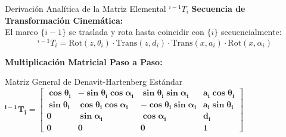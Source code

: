 \documentclass[aspectratio=169]{beamer}
\begin{document}
\begin{frame}{Derivación Analítica de la Matriz Elemental $^{i-1}T_i$}
    \textbf{Secuencia de Transformación Cinemática:}\\
    El marco $\{i-1\}$ se traslada y rota hasta coincidir con $\{i\}$ secuencialmente:
    \begin{equation*}
        ^{i-1}T_i = \text{Rot}(z, \theta_i) \cdot \text{Trans}(z, d_i) \cdot \text{Trans}(x, a_i) \cdot \text{Rot}(x, \alpha_i)
    \end{equation*}
    
    \vspace{0.1cm}
    \textbf{Multiplicación Matricial Paso a Paso:}
    
    \vspace{0.1cm}
    \begin{alertblock}{Matriz General de Denavit-Hartenberg Estándar}
    \centering
        $\mathbf{^{i-1}T_i = \begin{bmatrix}      
        \cos\theta_i & -\sin\theta_i \cos\alpha_i & \sin\theta_i \sin\alpha_i & a_i \cos\theta_i \\      
        \sin\theta_i & \cos\theta_i \cos\alpha_i & -\cos\theta_i \sin\alpha_i & a_i \sin\theta_i \\      
        0 & \sin\alpha_i & \cos\alpha_i & d_i \\      
        0 & 0 & 0 & 1      
        \end{bmatrix}}$
    \end{alertblock}
\end{frame}
\end{document}
